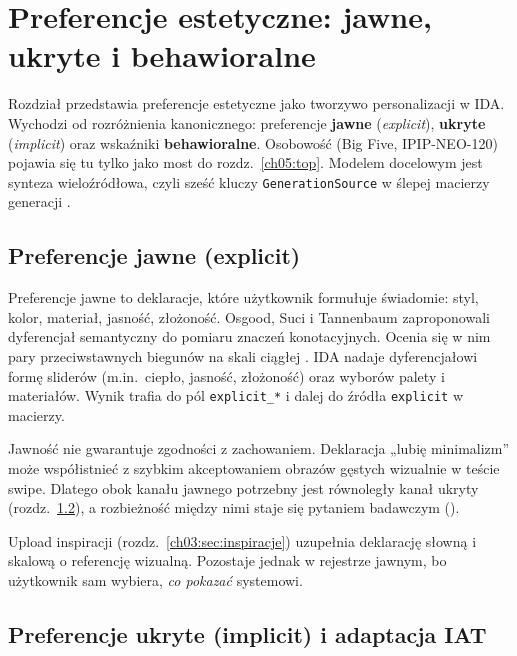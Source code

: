 \chapter{Preferencje estetyczne: jawne, ukryte i behawioralne}
\label{ch03:top}

Rozdział przedstawia preferencje estetyczne jako tworzywo personalizacji w IDA.
Wychodzi od rozróżnienia kanonicznego: preferencje \textbf{jawne} (\emph{explicit}), \textbf{ukryte} (\emph{implicit}) oraz wskaźniki \textbf{behawioralne}. Osobowość (Big Five, IPIP-NEO-120) pojawia się tu tylko jako most do rozdz.~\ref{ch05:top}.
Modelem docelowym jest synteza wieloźródłowa, czyli sześć kluczy \texttt{GenerationSource} w ślepej macierzy generacji \parencite{idaPlatform2026}.

\section{Preferencje jawne (explicit)}
\label{ch03:sec:explicit}

Preferencje jawne to deklaracje, które użytkownik formułuje świadomie: styl, kolor, materiał, jasność, złożoność.
Osgood, Suci i Tannenbaum zaproponowali dyferencjał semantyczny do pomiaru znaczeń konotacyjnych. Ocenia się w nim pary przeciwstawnych biegunów na skali ciągłej \parencite{osgood1957measurement}.
IDA nadaje dyferencjałowi formę sliderów (m.in.\ ciepło, jasność, złożoność) oraz wyborów palety i materiałów. Wynik trafia do pól \texttt{explicit\_*} i dalej do źródła \texttt{explicit} w macierzy.

Jawność nie gwarantuje zgodności z zachowaniem.
Deklaracja „lubię minimalizm” może współistnieć z szybkim akceptowaniem obrazów gęstych wizualnie w teście swipe. Dlatego obok kanału jawnego potrzebny jest równoległy kanał ukryty (rozdz.~\ref{ch03:sec:implicit}), a rozbieżność między nimi staje się pytaniem badawczym ().

Upload inspiracji (rozdz.~\ref{ch03:sec:inspiracje}) uzupełnia deklarację słowną i skalową o referencję wizualną. Pozostaje jednak w rejestrze jawnym, bo użytkownik sam wybiera, \emph{co pokazać} systemowi.

\section{Preferencje ukryte (implicit) i adaptacja IAT}
\label{ch03:sec:implicit}

